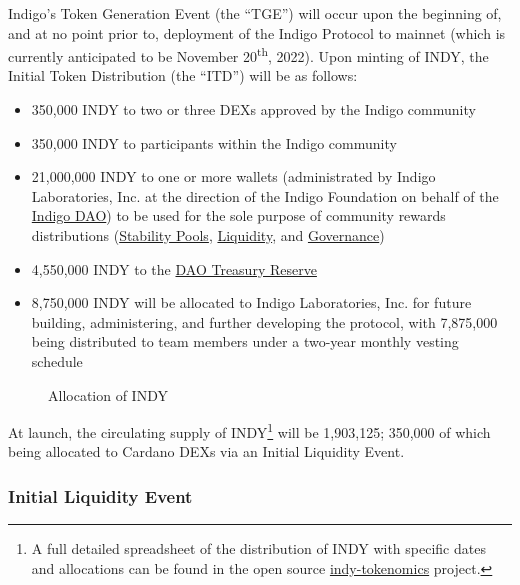 \documentclass{article}
\begin{document}
\begin{sloppypar}
Indigo's Token Generation Event (the ``TGE'') will occur upon the
beginning of, and at no point prior to, deployment of the Indigo
Protocol to mainnet (which is currently anticipated to be November
20\textsuperscript{th}, 2022). Upon minting of INDY, the Initial Token
Distribution (the ``ITD'') will be as follows:

\begin{itemize}
\item
  350,000 INDY to two or three DEXs approved by the Indigo community
\item
  350,000 INDY to participants within the Indigo community
\item
  21,000,000 INDY to one or more wallets (administrated by Indigo
  Laboratories, Inc. at the direction of the Indigo Foundation on behalf
  of the \protect\hyperlink{governance}{Indigo DAO}) to be used for the
  sole purpose of community rewards distributions
  (\protect\hyperlink{stability-pool-staking-rewards}{Stability Pools},
  \protect\hyperlink{liquidity-staking-rewards}{Liquidity}, and
  \protect\hyperlink{staking}{Governance})
\item
  4,550,000 INDY to the \protect\hyperlink{indigo-dao-treasury}{DAO
  Treasury Reserve}
\item
  8,750,000 INDY will be allocated to Indigo Laboratories, Inc. for
  future building, administering, and further developing the protocol,
  with 7,875,000 being distributed to team members under a two-year
  monthly vesting schedule
\end{itemize}

\hypertarget{indy-piechart}{%
\begin{figure}[htbp]
\centering

\caption{Allocation of INDY}
\end{figure}}

At launch, the circulating supply of INDY\footnote{A full detailed
  spreadsheet of the distribution of INDY with specific dates and
  allocations can be found in the open source
  \href{https://github.com/IndigoProtocol/indy-tokenomics}{indy-tokenomics}
  project.} will be 1,903,125; 350,000 of which being allocated to
Cardano DEXs via an Initial Liquidity Event.

\hypertarget{initial-liquidity-event}{%
\subsubsection{Initial Liquidity Event}\label{initial-liquidity-event}}


\end{sloppypar}
\end{document}
